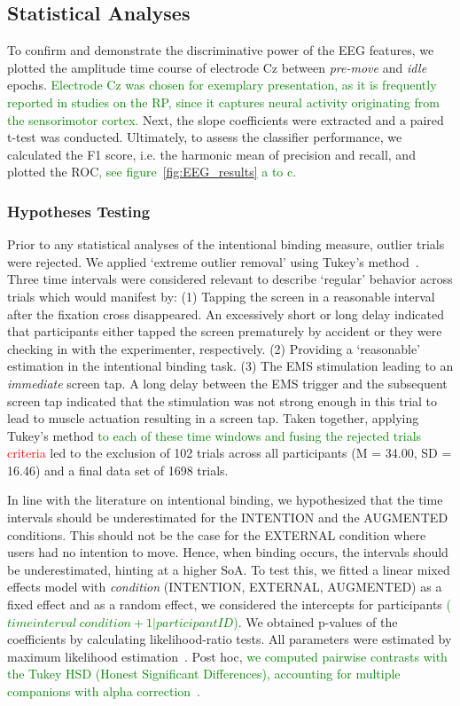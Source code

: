 \subsection{Statistical Analyses}
To confirm and demonstrate the discriminative power of the EEG features, we plotted the amplitude time course of electrode Cz between \textit{pre-move} and \textit{idle} epochs. \textcolor{green}{Electrode Cz was chosen for exemplary presentation, as it is frequently reported in studies on the RP, since it captures neural activity originating from the sensorimotor cortex.} Next, the slope coefficients were extracted and a paired t-test was conducted. Ultimately, to assess the classifier performance, we calculated the F1 score, i.e. the harmonic mean of precision and recall, and plotted the ROC\textcolor{green}{, see figure~\ref{fig:EEG_results} a to c.}

\subsubsection{Hypotheses Testing}
Prior to any statistical analyses of the intentional binding measure, outlier trials were rejected. We applied `extreme outlier removal' using Tukey's method~\cite{Tukey1949-sl}. Three time intervals were considered relevant to describe `regular' behavior across trials which would manifest by: (1) Tapping the screen in a reasonable interval after the fixation cross disappeared. An excessively short or long delay indicated that participants either tapped the screen prematurely by accident or they were checking in with the experimenter, respectively. (2) Providing a `reasonable' estimation in the intentional binding task. (3) The EMS stimulation leading to an \textit{immediate} screen tap. A long delay between the EMS trigger and the subsequent screen tap indicated that the stimulation was not strong enough in this trial to lead to muscle actuation resulting in a screen tap. Taken together, applying Tukey's method \textcolor{green}{to each of these time windows and fusing the rejected trials} \textcolor{red}{criteria} led to the exclusion of 102 trials across all participants (M = 34.00, SD = 16.46) and a final data set of 1698 trials.

In line with the literature on intentional binding, we hypothesized that the time intervals should be underestimated for the INTENTION and the AUGMENTED conditions. This should not be the case for the EXTERNAL condition where users had no intention to move. Hence, when binding occurs, the intervals should be underestimated, hinting at a higher SoA. To test this, we fitted a linear mixed effects model with \textit{condition} (INTENTION, EXTERNAL, AUGMENTED) as a fixed effect and as a random effect, we considered the intercepts for participants \textcolor{green}{($time interval ~ condition + 1|participantID$)}. We obtained p-values of the coefficients by calculating likelihood-ratio tests. All parameters were estimated by maximum likelihood estimation~\cite{Pinheiro2006-bk}. Post hoc, \textcolor{green}{we computed pairwise contrasts with the Tukey HSD (Honest Significant Differences), accounting for multiple companions with alpha correction~\cite{Lenth2020-xk}.}

